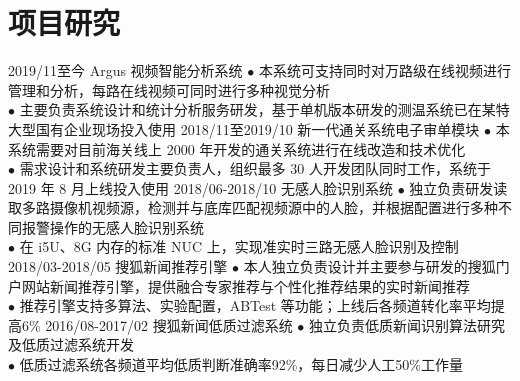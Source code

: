 \documentclass[a4paper,10pt]{professional-cv-cn}
\begin{document}
\section{项目研究}

\begin{entrylist}
  \entry
    {2019/11至今}
    {Argus 视频智能分析系统}
    {}
    {$\bullet$ 本系统可支持同时对万路级在线视频进行管理和分析，每路在线视频可同时进行多种视觉分析\\
    $\bullet$ 主要负责系统设计和统计分析服务研发，基于单机版本研发的测温系统已在某特大型国有企业现场投入使用}
  \entry
    {2018/11至2019/10}
    {新一代通关系统电子审单模块}
    {}
    {$\bullet$ 本系统需要对目前海关线上 2000 年开发的通关系统进行在线改造和技术优化\\
    $\bullet$ 需求设计和系统研发主要负责人，组织最多 30 人开发团队同时工作，系统于 2019 年 8 月上线投入使用}
  \entry
    {2018/06-2018/10}
    {无感人脸识别系统}
    {}
    {$\bullet$ 独立负责研发读取多路摄像机视频源，检测并与底库匹配视频源中的人脸，并根据配置进行多种不同报警操作的无感人脸识别系统\\
    $\bullet$ 在 i5U、8G 内存的标准 NUC 上，实现准实时三路无感人脸识别及控制}
  \entry
    {2018/03-2018/05}
    {搜狐新闻推荐引擎}
    {}
    {$\bullet$ 本人独立负责设计并主要参与研发的搜狐门户网站新闻推荐引擎，提供融合专家推荐与个性化推荐结果的实时新闻推荐 \\
    $\bullet$ 推荐引擎支持多算法、实验配置，ABTest 等功能；上线后各频道转化率平均提高6\%}
  \entry
    {2016/08-2017/02}
    {搜狐新闻低质过滤系统}
    {}
    {$\bullet$ 独立负责低质新闻识别算法研究及低质过滤系统开发\\
    $\bullet$ 低质过滤系统各频道平均低质判断准确率92\%，每日减少人工50\%工作量}
\end{entrylist}
\end{document}
